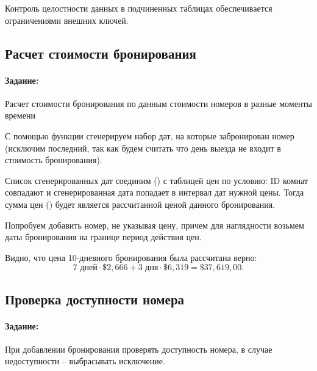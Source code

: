 Контроль целостности данных в подчиненных таблицах обеспечивается ограничениями  внешних ключей.



\vspace{-1em}
\subsection{Расчет стоимости бронирования}

\paragraph{Задание:} Расчет стоимости бронирования по данным стоимости номеров в разные моменты времени

С помощью функции  сгенерируем набор дат, на которые забронирован номер (исключим последний, так как будем считать что день выезда не входит в стоимость бронирования).

Список сгенерированных дат соединим () с таблицей цен по условию: ID комнат совпадают и сгенерированная дата попадает в интервал дат нужной цены. Тогда сумма цен () будет является рассчитанной ценой данного бронирования.



Попробуем добавить номер, не указывая цену, причем для наглядности возьмем даты бронирования на границе период действия цен.



Видно, что цена 10-дневного бронирования была рассчитана верно: 
\begin{displaymath}
7\text{ дней} \cdot \$2,666 + 3\text{ дня} \cdot \$6,319 = \$37,619,00.
\end{displaymath}

\subsection{Проверка доступности номера}

\paragraph{Задание:} При добавлении бронирования проверять доступность номера, в случае недоступности -- выбрасывать исключение.

